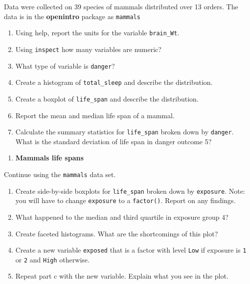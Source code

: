 \documentclass[
]{book}
\providecommand{\tightlist}{%
  \setlength{\itemsep}{0pt}\setlength{\parskip}{0pt}}
\begin{document}
Data were collected on 39 species of mammals distributed over 13 orders. The data is in the \textbf{openintro} package as \texttt{mammals}

\begin{enumerate}
\def\labelenumi{\alph{enumi}.}
\tightlist
\item
  Using help, report the units for the variable \texttt{brain\_Wt}.\\
\item
  Using \texttt{inspect} how many variables are numeric?\\
\item
  What type of variable is \texttt{danger}?
\item
  Create a histogram of \texttt{total\_sleep} and describe the distribution.\\
\item
  Create a boxplot of \texttt{life\_span} and describe the distribution.\\
\item
  Report the mean and median life span of a mammal.\\
\item
  Calculate the summary statistics for \texttt{life\_span} broken down by \texttt{danger}. What is the standard deviation of life span in danger outcome 5?
\end{enumerate}

\begin{enumerate}
\def\labelenumi{\arabic{enumi}.}
\setcounter{enumi}{1}
\tightlist
\item
  \textbf{Mammals life spans}
\end{enumerate}

Continue using the \texttt{mammals} data set.

\begin{enumerate}
\def\labelenumi{\alph{enumi}.}
\tightlist
\item
  Create side-by-side boxplots for \texttt{life\_span} broken down by \texttt{exposure}. Note: you will have to change \texttt{exposure} to a \texttt{factor()}. Report on any findings.\\
\item
  What happened to the median and third quartile in exposure group 4?
\item
  Create faceted histograms. What are the shortcomings of this plot?
\item
  Create a new variable \texttt{exposed} that is a factor with level \texttt{Low} if exposure is \texttt{1} or \texttt{2} and \texttt{High} otherwise.
\item
  Repeat part c with the new variable. Explain what you see in the plot.
\end{enumerate}
\end{document}
